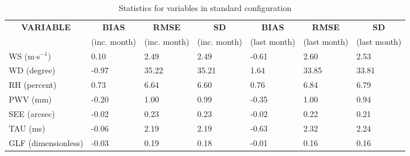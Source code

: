 \documentclass[11pt,english]{article}
\begin{document}
\clearpage
\begin{table}[]
\begin{center}
\begin{tabular}{|l|l|l|l|l|l|l|}
\hline
\multicolumn{1}{|c|}{\cellcolor[HTML]{C0C0C0}\textbf{VARIABLE}} & \multicolumn{1}{c|}{\cellcolor[HTML]{C0C0C0}\textbf{BIAS}} & \multicolumn{1}{c|}{\cellcolor[HTML]{C0C0C0}\textbf{RMSE}} & \multicolumn{1}{c|}{\cellcolor[HTML]{C0C0C0}\textbf{SD}} & \multicolumn{1}{c|}{\cellcolor[HTML]{C0C0C0}\textbf{BIAS}} & \multicolumn{1}{c|}{\cellcolor[HTML]{C0C0C0}\textbf{RMSE}} & \multicolumn{1}{c|}{\cellcolor[HTML]{C0C0C0}\textbf{SD}}\\
\multicolumn{1}{|c|}{\cellcolor[HTML]{C0C0C0}} & \multicolumn{1}{c|}{\cellcolor[HTML]{C0C0C0}(inc. month)} & \multicolumn{1}{c|}{\cellcolor[HTML]{C0C0C0}(inc. month)} & \multicolumn{1}{c|}{\cellcolor[HTML]{C0C0C0}(inc. month)} & \multicolumn{1}{c|}{\cellcolor[HTML]{C0C0C0}(last month)} & \multicolumn{1}{c|}{\cellcolor[HTML]{C0C0C0}(last month)} & \multicolumn{1}{c|}{\cellcolor[HTML]{C0C0C0}(last month)}\\\hline
\cellcolor[HTML]{C0C0C0}WS (m$\cdot$s$^{-1}$) &      0.10  &      2.49  &      2.49  &     -0.61     &      2.60     &      2.53\\
\cellcolor[HTML]{C0C0C0}WD (degree)           &     -0.97  &     35.22  &     35.21  &      1.64     &     33.85     &     33.81\\
\cellcolor[HTML]{C0C0C0}RH (percent)          &      0.73  &      6.64  &      6.60  &      0.76     &      6.84     &      6.79\\
\cellcolor[HTML]{C0C0C0}PWV (mm)              &     -0.20 &      1.00 &      0.99 &     -0.35    &      1.00    &      0.94\\
\cellcolor[HTML]{C0C0C0}SEE (arcsec)          &     -0.02 &      0.23 &      0.23 &     -0.02    &      0.22    &      0.21\\
\cellcolor[HTML]{C0C0C0}TAU (ms)              &     -0.06 &      2.19 &      2.19 &     -0.63    &      2.32    &      2.24\\
\cellcolor[HTML]{C0C0C0}GLF (dimensionless)   &     -0.03 &      0.19 &      0.18 &     -0.01    &      0.16    &      0.16\\
\hline
\end{tabular}
\caption{Statistics for variables in standard configuration}
\end{center}
\end{table}
\end{document}
